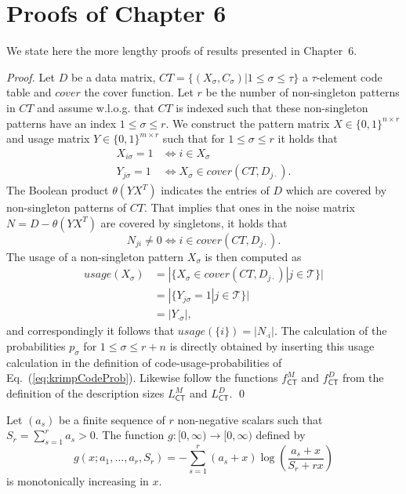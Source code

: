 \chapter{Proofs of Chapter 6}\label{chap:AppendixMDL}
We state here the more lengthy proofs of results presented in Chapter~6.
\lctbmf*
\begin{proof}
Let $D$ be a data matrix, $CT=\{(\mathit{X_\sigma,C_\sigma})|1\leq\sigma\leq\tau\}$ a $\tau$-element code table and $cover$ the cover function. Let $r$ be the number of non-singleton patterns in $CT$ and assume w.l.o.g. that $CT$ is indexed such that these non-singleton patterns have an index $1\leq\sigma\leq r$. We construct the pattern matrix $X\in \{0,1\}^{n\times r}$ and usage matrix $Y\in \{0,1\}^{m\times r}$ such that for $1\leq\sigma\leq r$ it holds that
\begin{align*}
X_{i\sigma}=1&\Leftrightarrow i\in \mathit{X_\sigma}\\
Y_{j\sigma}=1&\Leftrightarrow \mathit{X_\sigma}\in cover(CT,D_{j\cdot}).
\end{align*}
The Boolean product $\theta(YX^T)$ indicates the entries of $D$ which are covered by non-singleton patterns of $CT$. That implies that ones in the noise matrix $N=D-\theta(YX^T)$ are covered by singletons, it holds that 
\[N_{ji}\neq 0\Leftrightarrow {i}\in cover(CT,D_{j\cdot}).\]
The usage of a non-singleton pattern $X_\sigma$ is then computed as
\begin{align*}
usage(X_\sigma)&=|\{X_\sigma\in cover(CT,D_{j\cdot})|j\in\mathcal{T}\}|\\
&=|\{Y_{j\sigma}=1|j\in\mathcal{T}\}|\\
&=|Y_{\cdot\sigma}|,
\end{align*}
and correspondingly it follows that $usage(\{i\})=|N_{\cdot i}|$. The calculation of the probabilities $p_\sigma$ for $1\leq \sigma \leq r+n$ is directly obtained by inserting this usage calculation in the definition of code-usage-probabilities of Eq.~(\ref{eq:krimpCodeProb}). Likewise follow the functions $f_{\mathsf{CT}}^M$ and $f_{\mathsf{CT}}^D$ from the definition of the description sizes $L_{\mathsf{CT}}^M$ and $L_{\mathsf{CT}}^D$.
\qed
\end{proof}
\begin{lemma}\label{thm:monoticity}
Let $(a_s)$ be a finite sequence of $r$ non-negative scalars such that $S_r=\sum_{s=1}^ra_s>0$. The function $g:[0,\infty)\rightarrow[0,\infty)$ defined by
\[g(x;a_1,\ldots,a_r,S_r)=-\sum_{s=1}^r(a_s+x)\log\left(\frac{a_s+x}{S_r+rx}\right)\]
is monotonically increasing in $x$.
\end{lemma}
